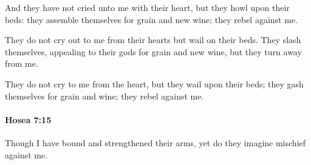 			\begin{versebox}
					\item[BHS] 
					\item[LXX] 
					\item[ASV] And they have not cried unto me with their heart, but they howl upon their beds: they assemble themselves for grain and new wine; they rebel against me.
					\item[NIV] They do not cry out to me from their hearts but wail on their beds. They slash themselves, appealing to their gods for grain and new wine, but they turn away from me.
					\item[NRSV] They do not cry to me from the heart, but they wail upon their beds; they gash themselves for grain and wine; they rebel against me.
			\end{versebox}

		\paragraph{Hosea 7:15} %
			\label{HOSEA-7-15}

			Though I have bound and strengthened their arms, yet do they imagine mischief against me.

